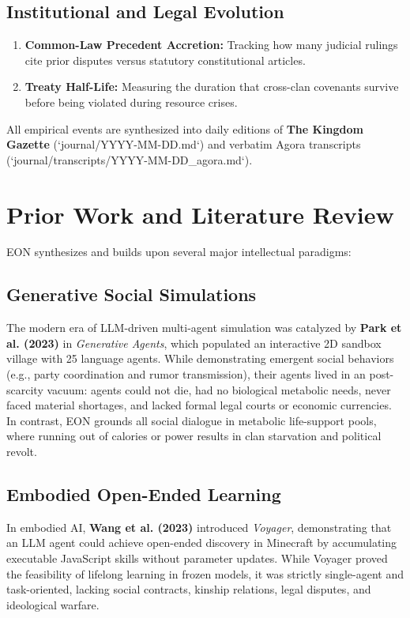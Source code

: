 \documentclass[11pt,a4paper]{article}
\begin{document}
\subsection{Institutional and Legal Evolution}
\begin{enumerate}[leftmargin=*]
    \item \textbf{Common-Law Precedent Accretion:} Tracking how many judicial rulings cite prior disputes versus statutory constitutional articles.
    \item \textbf{Treaty Half-Life:} Measuring the duration that cross-clan covenants survive before being violated during resource crises.
\end{enumerate}

All empirical events are synthesized into daily editions of \textbf{The Kingdom Gazette} (`journal/YYYY-MM-DD.md`) and verbatim Agora transcripts (`journal/transcripts/YYYY-MM-DD_agora.md`).

\section{Prior Work and Literature Review}
\label{sec:prior_work}

EON synthesizes and builds upon several major intellectual paradigms:

\subsection{Generative Social Simulations}
The modern era of LLM-driven multi-agent simulation was catalyzed by \textbf{Park et al. (2023)} \cite{park2023generative} in \textit{Generative Agents}, which populated an interactive 2D sandbox village with 25 language agents. While demonstrating emergent social behaviors (e.g., party coordination and rumor transmission), their agents lived in an post-scarcity vacuum: agents could not die, had no biological metabolic needs, never faced material shortages, and lacked formal legal courts or economic currencies. In contrast, EON grounds all social dialogue in metabolic life-support pools, where running out of calories or power results in clan starvation and political revolt.

\subsection{Embodied Open-Ended Learning}
In embodied AI, \textbf{Wang et al. (2023)} \cite{wang2023voyager} introduced \textit{Voyager}, demonstrating that an LLM agent could achieve open-ended discovery in Minecraft by accumulating executable JavaScript skills without parameter updates. While Voyager proved the feasibility of lifelong learning in frozen models, it was strictly single-agent and task-oriented, lacking social contracts, kinship relations, legal disputes, and ideological warfare.
\end{document}
